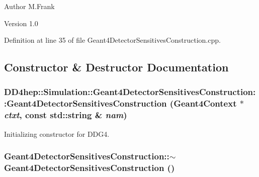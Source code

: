 \begin{DoxyAuthor}{Author}
M.Frank 
\end{DoxyAuthor}
\begin{DoxyVersion}{Version}
1.0 
\end{DoxyVersion}


Definition at line 35 of file Geant4DetectorSensitivesConstruction.cpp.

\subsection{Constructor \& Destructor Documentation}
\hypertarget{class_d_d4hep_1_1_simulation_1_1_geant4_detector_sensitives_construction_a71ee5bd251232f76d5891b2e7047ba76}{
\subsubsection[{Geant4DetectorSensitivesConstruction}]{\setlength{\rightskip}{0pt plus 5cm}DD4hep::Simulation::Geant4DetectorSensitivesConstruction::Geant4DetectorSensitivesConstruction ({\bf Geant4Context} $\ast$ {\em ctxt}, \/  const std::string \& {\em nam})}}
\label{class_d_d4hep_1_1_simulation_1_1_geant4_detector_sensitives_construction_a71ee5bd251232f76d5891b2e7047ba76}


Initializing constructor for DDG4. \hypertarget{class_d_d4hep_1_1_simulation_1_1_geant4_detector_sensitives_construction_a3013821bbc1d900a35f0a4e26a1956b6}{
\subsubsection[{$\sim$Geant4DetectorSensitivesConstruction}]{\setlength{\rightskip}{0pt plus 5cm}Geant4DetectorSensitivesConstruction::$\sim$Geant4DetectorSensitivesConstruction ()}}
\label{class_d_d4hep_1_1_simulation_1_1_geant4_detector_sensitives_construction_a3013821bbc1d900a35f0a4e26a1956b6}


